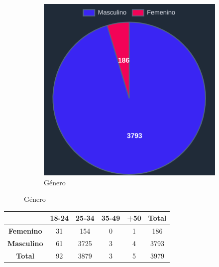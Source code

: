 \documentclass{beamer}
\begin{document}
\begin{frame}
\begin{figure}[H]
\begin{subfigure}{0.3\textwidth}
					\includegraphics[width=\textwidth]{imaxes/capturas-app/graficos/grivas/grafico-genero.png}
					\caption{Género}
					\label{subfig:blm/resultados-genero-moda}
			\end{subfigure}
		\end{figure}
			\begin{table}[H]
			{
				\setlength{\tabcolsep}{0.6\tabcolsep}
				\begin{tabular}{|c|c|c|c|c|c|}
					\hline
					\diagbox{\textbf{Género}}{\textbf{Edad}} & \textbf{18-24} & \textbf{25-34} & \textbf{35-49} & \textbf{+50} & \textbf{Total} \\ \hline
					\textbf{Femenino} & 31 & 154 & 0 & 1 & 186 \\ \hline
					\textbf{Masculino} & 61 & 3725 & 3 & 4 & 3793 \\ \hline
					\textbf{Total} & 92 & 3879 & 3 & 5 & 3979 \\ \hline
					
				\end{tabular}%
			}
		\end{table}
\end{frame}
\end{document}
